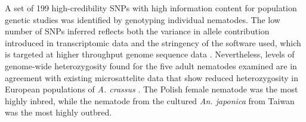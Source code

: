 \documentclass[10pt]{bmc_article}
\newenvironment{bmcformat}{\begin{raggedright}\baselineskip20pt\sloppy\setboolean{publ}{false}}{\end{raggedright}\baselineskip20pt\sloppy}
\begin{document}
\begin{bmcformat}
A set of 199 high-credibility SNPs with high information content for
population genetic studies was identified by genotyping individual
nematodes. The low number of SNPs inferred reflects both the variance
in allele contribution introduced in transcriptomic data and the
stringency of the software used, which is targeted at higher
throughput genome sequence data \cite{pmid21653522x}. Nevertheless,
levels of genome-wide heterozygosity found for the five adult
nematodes examined are in agreement with existing microsattelite data
that show reduced heterozygosity in European populations of
\textit{A. crassus} \cite{wielgoss_population_2008}. The Polish female
nematode was the most highly inbred, while the nematode from the
cultured
\textit{An. japonica} from Taiwan was the most highly outbred.\\


\end{bmcformat}
\end{document}

